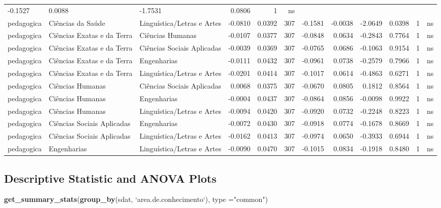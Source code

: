 \documentclass[]{article}
\newenvironment{Shaded}{\begin{snugshade}}{\end{snugshade}}
\newcommand{\DataTypeTok}[1]{\textcolor[rgb]{0.13,0.29,0.53}{#1}}
\newcommand{\KeywordTok}[1]{\textcolor[rgb]{0.13,0.29,0.53}{\textbf{#1}}}
\newcommand{\NormalTok}[1]{#1}
\newcommand{\StringTok}[1]{\textcolor[rgb]{0.31,0.60,0.02}{#1}}
\begin{document}
\begin{longtable}[]{@{}lllrrrrrrrll@{}}
-0.1527 & 0.0088 & -1.7531 & 0.0806 & 1 & ns\tabularnewline
pedagogica & Ciências da Saúde & Linguística/Letras e Artes & -0.0810 &
0.0392 & 307 & -0.1581 & -0.0038 & -2.0649 & 0.0398 & 1 &
ns\tabularnewline
pedagogica & Ciências Exatas e da Terra & Ciências Humanas & -0.0107 &
0.0377 & 307 & -0.0848 & 0.0634 & -0.2843 & 0.7764 & 1 &
ns\tabularnewline
pedagogica & Ciências Exatas e da Terra & Ciências Sociais Aplicadas &
-0.0039 & 0.0369 & 307 & -0.0765 & 0.0686 & -0.1063 & 0.9154 & 1 &
ns\tabularnewline
pedagogica & Ciências Exatas e da Terra & Engenharias & -0.0111 & 0.0432
& 307 & -0.0961 & 0.0738 & -0.2579 & 0.7966 & 1 & ns\tabularnewline
pedagogica & Ciências Exatas e da Terra & Linguística/Letras e Artes &
-0.0201 & 0.0414 & 307 & -0.1017 & 0.0614 & -0.4863 & 0.6271 & 1 &
ns\tabularnewline
pedagogica & Ciências Humanas & Ciências Sociais Aplicadas & 0.0068 &
0.0375 & 307 & -0.0670 & 0.0805 & 0.1812 & 0.8564 & 1 &
ns\tabularnewline
pedagogica & Ciências Humanas & Engenharias & -0.0004 & 0.0437 & 307 &
-0.0864 & 0.0856 & -0.0098 & 0.9922 & 1 & ns\tabularnewline
pedagogica & Ciências Humanas & Linguística/Letras e Artes & -0.0094 &
0.0420 & 307 & -0.0920 & 0.0732 & -0.2248 & 0.8223 & 1 &
ns\tabularnewline
pedagogica & Ciências Sociais Aplicadas & Engenharias & -0.0072 & 0.0430
& 307 & -0.0918 & 0.0774 & -0.1678 & 0.8669 & 1 & ns\tabularnewline
pedagogica & Ciências Sociais Aplicadas & Linguística/Letras e Artes &
-0.0162 & 0.0413 & 307 & -0.0974 & 0.0650 & -0.3933 & 0.6944 & 1 &
ns\tabularnewline
pedagogica & Engenharias & Linguística/Letras e Artes & -0.0090 & 0.0470
& 307 & -0.1015 & 0.0834 & -0.1918 & 0.8480 & 1 & ns\tabularnewline
\bottomrule
\end{longtable}

\hypertarget{descriptive-statistic-and-anova-plots}{%
\subsection{Descriptive Statistic and ANOVA
Plots}\label{descriptive-statistic-and-anova-plots}}

\begin{Shaded}
\begin{Highlighting}[]
\KeywordTok{get_summary_stats}\NormalTok{(}\KeywordTok{group_by}\NormalTok{(sdat, }\StringTok{`}\DataTypeTok{area.de.conhecimento}\StringTok{`}\NormalTok{), }\DataTypeTok{type =}\StringTok{"common"}\NormalTok{)}
\end{Highlighting}
\end{Shaded}
\end{document}
